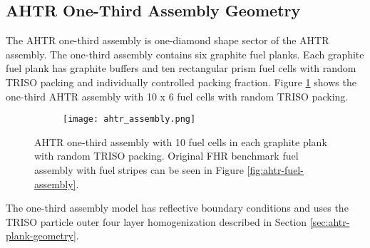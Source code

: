 \subsection{AHTR One-Third Assembly Geometry}
\label{sec:ahtr-assem-geometry}
The \gls{AHTR} one-third assembly is one-diamond shape sector of the \gls{AHTR} assembly. 
The one-third assembly contains six graphite fuel planks.
Each graphite fuel plank has graphite buffers and ten rectangular prism fuel cells 
with random TRISO packing and individually controlled packing fraction. 
Figure \ref{fig:ahtr_assembly} shows the one-third \gls{AHTR} assembly with 10 x 6 
fuel cells with random \gls{TRISO} packing.
\begin{figure}[htbp]
    \centering
    \begin{subfigure}{.7\textwidth}
    \texttt{[image: ahtr\_assembly.png]}
    \end{subfigure}%
    \begin{subfigure}{.3\textwidth}
        \vspace{1cm}
    \end{subfigure}
    \caption{\acrfull{AHTR} one-third assembly with 10 fuel cells in each graphite plank 
    with random TRISO packing. Original \gls{FHR} benchmark fuel assembly with fuel 
    stripes can be seen in Figure \ref{fig:ahtr-fuel-assembly}.}
    \label{fig:ahtr_assembly}
\end{figure}
The one-third assembly model has reflective boundary conditions and  
uses the \gls{TRISO} particle outer four layer 
homogenization described in Section \ref{sec:ahtr-plank-geometry}.


